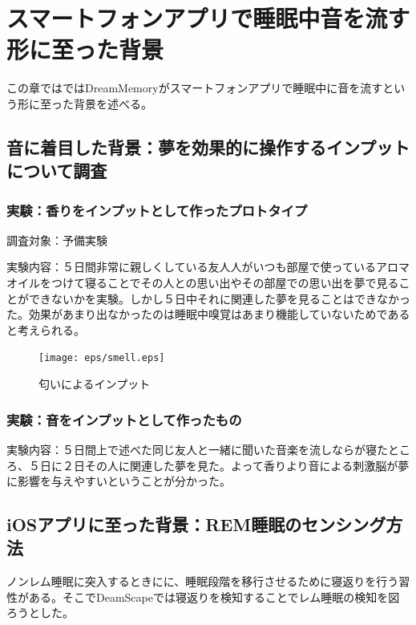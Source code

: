 \chapter{スマートフォンアプリで睡眠中音を流す形に至った背景}
\label{chap:visualize}

この章ではではDreamMemoryがスマートフォンアプリで睡眠中に音を流すという形に至った背景を述べる。

\section{音に着目した背景：夢を効果的に操作するインプットについて調査}
\subsection{実験：香りをインプットとして作ったプロトタイプ}
調査対象：予備実験

実験内容：５日間非常に親しくしている友人人がいつも部屋で使っているアロマオイルをつけて寝ることでその人との思い出やその部屋での思い出を夢で見ることができないかを実験。しかし５日中それに関連した夢を見ることはできなかった。効果があまり出なかったのは睡眠中嗅覚はあまり機能していないためであると考えられる。
\begin{figure}[htbp]
\begin{center}
\texttt{[image: eps/smell.eps]}
\caption{匂いによるインプット}
\label{匂いによるインプット}
\end{center}
\end{figure}

\subsection{実験：音をインプットとして作ったもの}
実験内容：５日間上で述べた同じ友人と一緒に聞いた音楽を流しならが寝たところ、５日に２日その人に関連した夢を見た。よって香りより音による刺激脳が夢に影響を与えやすいということが分かった。

\section{iOSアプリに至った背景：REM睡眠のセンシング方法}
ノンレム睡眠に突入するときにに、睡眠段階を移行させるために寝返りを行う習性がある\cite{negaeri}。そこでDeamScapeでは寝返りを検知することでレム睡眠の検知を図ろうとした。


